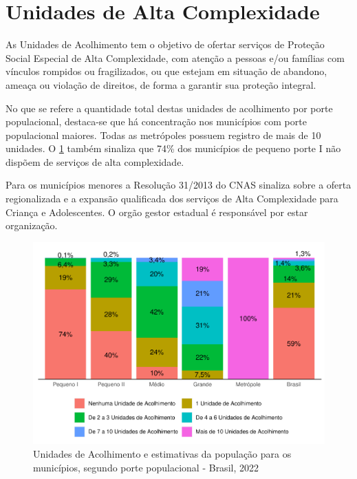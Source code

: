 \documentclass[
  brazilian]{report}
\begin{document}
\hypertarget{unidades-de-alta-complexidade}{%
\section{Unidades de Alta
Complexidade}\label{unidades-de-alta-complexidade}}

As Unidades de Acolhimento tem o objetivo de ofertar serviços de
Proteção Social Especial de Alta Complexidade, com atenção a pessoas
e/ou famílias com vínculos rompidos ou fragilizados, ou que estejam em
situação de abandono, ameaça ou violação de direitos, de forma a
garantir sua proteção integral.

No que se refere a quantidade total destas unidades de acolhimento por
porte populacional, destaca-se que há concentração nos municípios com
porte populacional maiores. Todas as metrópoles possuem registro de mais
de 10 unidades. O \cref{fig:unac-porte} também sinaliza que 74\% dos
municípios de pequeno porte I não dispõem de serviços de alta
complexidade.

Para os municípios menores a Resolução 31/2013 do CNAS sinaliza sobre a
oferta regionalizada e a expansão qualificada dos serviços de Alta
Complexidade para Criança e Adolescentes. O orgão gestor estadual é
responsável por estar organização.

\begin{figure}
\includegraphics{Censo-SUAS-2022_files/figure-latex/unac-porte-1} \caption[Unidades de Acolhimento e estimativas da população para os municípios, segundo porte populacional - Brasil, 2022]{Unidades de Acolhimento e estimativas da população para os municípios, segundo porte populacional - Brasil, 2022}\label{fig:unac-porte}
\end{figure}
\end{document}

